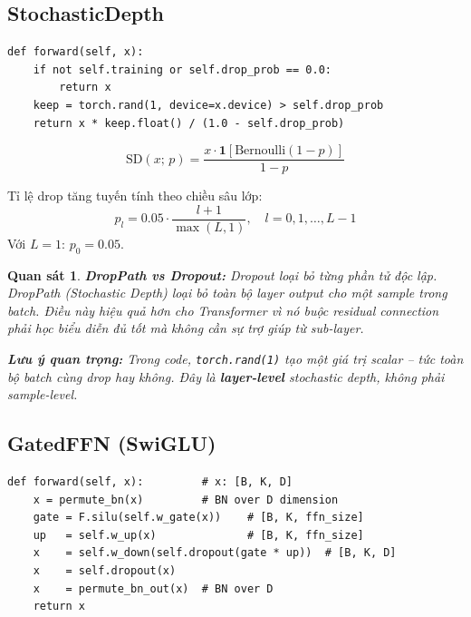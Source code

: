 \documentclass[12pt,a4paper]{article}
\newtheorem{observation}{Quan sát}[section]
\begin{document}
\subsection{StochasticDepth}

\begin{codebox}[title={local\_module.py -- StochasticDepth.forward()}]
\begin{lstlisting}
def forward(self, x):
    if not self.training or self.drop_prob == 0.0:
        return x
    keep = torch.rand(1, device=x.device) > self.drop_prob
    return x * keep.float() / (1.0 - self.drop_prob)
\end{lstlisting}
\end{codebox}

\begin{mathbox}[title={Công thức Stochastic Depth (DropPath)}]
\begin{equation}
  \text{SD}(x;\, p) = \frac{x \cdot \mathbf{1}[\text{Bernoulli}(1-p)]}{1-p}
  \label{eq:sd}
\end{equation}

Tỉ lệ drop tăng tuyến tính theo chiều sâu lớp:
\begin{equation}
  p_l = 0.05 \cdot \frac{l+1}{\max(L, 1)}, \quad l = 0, 1, \ldots, L-1
  \label{eq:sd_rate}
\end{equation}
Với $L=1$: $p_0 = 0.05$.
\end{mathbox}

\begin{observation}
\textbf{DropPath vs Dropout:} Dropout loại bỏ từng \emph{phần tử} độc lập.
DropPath (Stochastic Depth) loại bỏ toàn bộ \emph{layer output} cho một
sample trong batch. Điều này hiệu quả hơn cho Transformer vì nó buộc
residual connection phải học biểu diễn đủ tốt mà không cần sự trợ giúp
từ sub-layer.

\textbf{Lưu ý quan trọng:} Trong code, \texttt{torch.rand(1)} tạo
\emph{một giá trị scalar} -- tức toàn bộ batch cùng drop hay không.
Đây là \textbf{layer-level} stochastic depth, không phải sample-level.
\end{observation}

\subsection{GatedFFN (SwiGLU)}

\begin{codebox}[title={local\_module.py -- GatedFFN.forward()}]
\begin{lstlisting}
def forward(self, x):         # x: [B, K, D]
    x = permute_bn(x)         # BN over D dimension
    gate = F.silu(self.w_gate(x))    # [B, K, ffn_size]
    up   = self.w_up(x)              # [B, K, ffn_size]
    x    = self.w_down(self.dropout(gate * up))  # [B, K, D]
    x    = self.dropout(x)
    x    = permute_bn_out(x)  # BN over D
    return x
\end{lstlisting}
\end{codebox}
\end{document}

